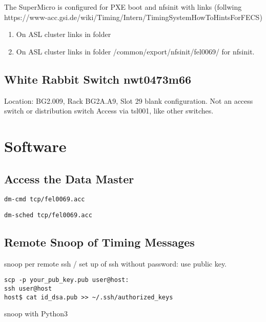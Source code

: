 \documentclass[12pt,a4paper]{report}
\begin{document}
The SuperMicro is configured for PXE boot and nfsinit with links (follwing
https://www-acc.gsi.de/wiki/Timing/Intern/TimingSystemHowToHintsForFECS)
\begin{enumerate}
\item On ASL cluster links in folder
\item On ASL cluster links in folder /common/export/nfsinit/fel0069/ for nfsinit.

\end{enumerate}

\section{White Rabbit Switch nwt0473m66}
Location: BG2.009, Rack BG2A.A9, Slot 29
blank configuration. Not an access switch or distribution switch
Access via tsl001, like other switches.
\chapter{Software}
\section{Access the Data Master}
\texttt{dm-cmd tcp/fel0069.acc}

\texttt{dm-sched tcp/fel0069.acc}

\section{Remote Snoop of Timing Messages}
snoop per remote ssh / set up of ssh without password: use public key.
\begin{verbatim}
scp -p your_pub_key.pub user@host:
ssh user@host
host$ cat id_dsa.pub >> ~/.ssh/authorized_keys
\end{verbatim}
snoop with Python3
\end{document}
